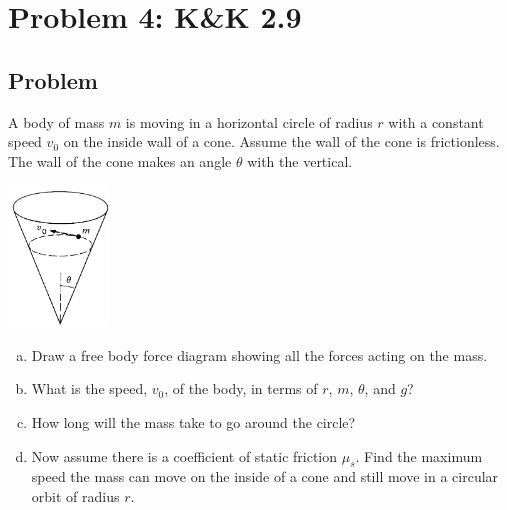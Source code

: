 \documentclass[solutions]{esg8012pset}
\begin{document}
\section*{Problem 4: K\&K 2.9}
\subsection*{Problem}
  A body of mass $m$ is moving in a horizontal circle of radius $r$ with a constant speed $v_0$ on the inside wall of a cone. Assume the wall of the cone is frictionless. The wall of the cone makes an angle $\theta$ with the vertical.
  \begin{center}\includegraphics[width=0.2\textwidth]{ps02_3}\end{center}
  \begin{enumerate}[a)]
    \item Draw a free body force diagram showing all the forces acting on the mass.
    \item What is the speed, $v_0$, of the body, in terms of $r$, $m$, $\theta$, and $g$?
    \item How long will the mass take to go around the circle?
    \item Now assume there is a coefficient of static friction $\mu_s$. Find the maximum speed the mass can move on the inside of a cone and still move in a circular orbit of radius $r$.
  \end{enumerate}
\end{document}
